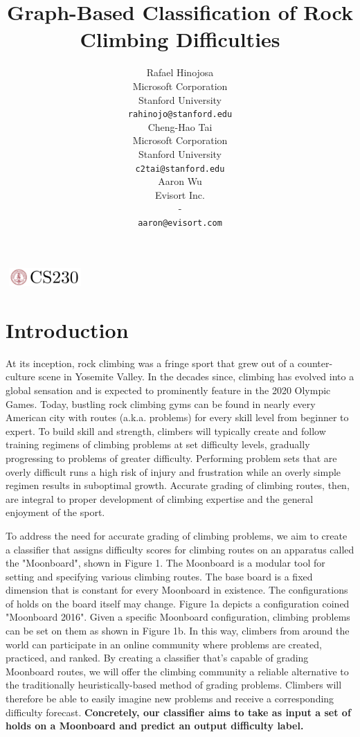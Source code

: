 \documentclass{article}
\title{Graph-Based Classification of Rock Climbing Difficulties}
\author{
  Rafael Hinojosa \\
  Microsoft Corporation \\
  Stanford University \\
  \texttt{rahinojo@stanford.edu} \\ 
  \And
  Cheng-Hao Tai \\
  Microsoft Corporation \\
  Stanford University \\
  \texttt{c2tai@stanford.edu} \\
  \And
  Aaron Wu \\
  Evisort Inc. \\
  - \\
  \texttt{aaron@evisort.com} \\
}
\begin{document}

\begin{center}
\includegraphics[width=3cm, height=0.7cm]{CS230}
\end{center}

\maketitle

\section{Introduction}	
At its inception, rock climbing was a fringe sport that grew out of a counter-culture scene in Yosemite Valley. In the decades since, climbing has evolved into a global sensation and is expected to prominently feature in the 2020 Olympic Games. Today, bustling rock climbing gyms can be found in nearly every American city with routes (a.k.a. problems) for every skill level from beginner to expert. To build skill and strength, climbers will typically create and follow training regimens of climbing problems at set difficulty levels, gradually progressing to problems of greater difficulty. Performing problem sets that are overly difficult runs a high risk of injury and frustration while an overly simple regimen results in suboptimal growth. Accurate grading of climbing routes, then, are integral to proper development of climbing expertise and the general enjoyment of the sport.

To address the need for accurate grading of climbing problems, we aim to create a classifier that assigns difficulty scores for climbing routes on an apparatus called the "Moonboard", shown in Figure 1. The Moonboard is a modular tool for setting and specifying various climbing routes. The base board is a fixed dimension that is constant for every Moonboard in existence. The configurations of holds on the board itself may change. Figure 1a depicts a configuration coined "Moonboard 2016". Given a specific Moonboard configuration, climbing problems can be set on them as shown in Figure 1b. In this way, climbers from around the world can participate in an online community where problems are created, practiced, and ranked. By creating a classifier that's capable of grading Moonboard routes, we will offer the climbing community a reliable alternative to the traditionally heuristically-based method of grading problems. Climbers will therefore be able to easily imagine new problems and receive a corresponding difficulty forecast. \textbf{Concretely, our classifier aims to take as input a set of holds on a Moonboard and predict an output difficulty label.}
\end{document}
